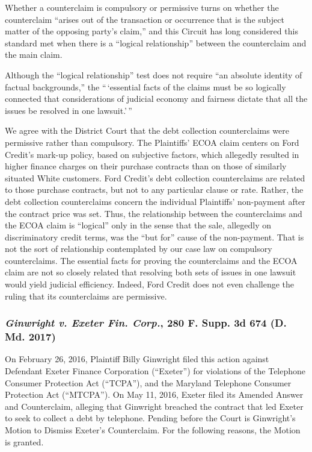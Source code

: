 \documentclass[11pt,letterpaper,twoside]{article}
\begin{document}
Whether a counterclaim is compulsory or permissive turns on whether the
counterclaim ``arises out of the transaction or occurrence that is the
subject matter of the opposing party's claim,'' and this Circuit has
long considered this standard met when there is a ``logical
relationship'' between the counterclaim and the main claim.

Although the ``logical relationship'' test does not require ``an
absolute identity of factual backgrounds,'' the ``\,`essential facts of
the claims must be so logically connected that considerations of
judicial economy and fairness dictate that all the issues be resolved in
one lawsuit.'\,''

We agree with the District Court that the debt collection counterclaims
were permissive rather than compulsory. The Plaintiffs' ECOA claim
centers on Ford Credit's mark-up policy, based on subjective factors,
which allegedly resulted in higher finance charges on their purchase
contracts than on those of similarly situated White customers. Ford
Credit's debt collection counterclaims are related to those purchase
contracts, but not to any particular clause or rate. Rather, the debt
collection counterclaims concern the individual Plaintiffs' non-payment
after the contract price was set. Thus, the relationship between the
counterclaims and the ECOA claim is ``logical'' only in the sense that
the sale, allegedly on discriminatory credit terms, was the ``but for''
cause of the non-payment. That is not the sort of relationship
contemplated by our case law on compulsory counterclaims. The essential
facts for proving the counterclaims and the ECOA claim are not so
closely related that resolving both sets of issues in one lawsuit would
yield judicial efficiency. Indeed, Ford Credit does not even challenge
the ruling that its counterclaims are permissive.

\subsubsection{\texorpdfstring{\emph{Ginwright v. Exeter Fin. Corp.},
280 F. Supp. 3d 674 (D. Md.
2017)}{Ginwright v. Exeter Fin. Corp., 280 F. Supp. 3d 674 (D. Md. 2017)}}\label{ginwrightexeterfincorp_dmd2017}

On February 26, 2016, Plaintiff Billy Ginwright filed this action
against Defendant Exeter Finance Corporation (``Exeter'') for violations
of the Telephone Consumer Protection Act (``TCPA''), and the Maryland
Telephone Consumer Protection Act (``MTCPA''). On May 11, 2016, Exeter
filed its Amended Answer and Counterclaim, alleging that Ginwright
breached the contract that led Exeter to seek to collect a debt by
telephone. Pending before the Court is Ginwright's Motion to Dismiss
Exeter's Counterclaim. For the following reasons, the Motion is granted.
\end{document}
